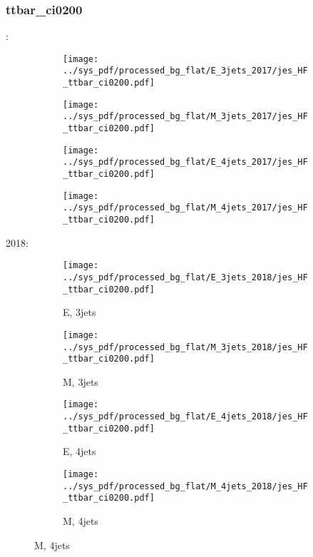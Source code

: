 \documentclass{beamer}
\begin{document}
\begin{frame}
\frametitle{ttbar_ci0200}
\fontsize{5}{1}:
\begin{figure}
\centering
\begin{subfigure}[b]{0.24\textwidth}
\texttt{[image: ../sys\_pdf/processed\_bg\_flat/E\_3jets\_2017/jes\_HF\_ttbar\_ci0200.pdf]}
\end{subfigure}
\begin{subfigure}[b]{0.24\textwidth}
\texttt{[image: ../sys\_pdf/processed\_bg\_flat/M\_3jets\_2017/jes\_HF\_ttbar\_ci0200.pdf]}
\end{subfigure}
\begin{subfigure}[b]{0.24\textwidth}
\texttt{[image: ../sys\_pdf/processed\_bg\_flat/E\_4jets\_2017/jes\_HF\_ttbar\_ci0200.pdf]}
\end{subfigure}
\begin{subfigure}[b]{0.24\textwidth}
\texttt{[image: ../sys\_pdf/processed\_bg\_flat/M\_4jets\_2017/jes\_HF\_ttbar\_ci0200.pdf]}
\end{subfigure}
\end{figure}
2018:
\begin{figure}
\centering
\begin{subfigure}[b]{0.24\textwidth}
\texttt{[image: ../sys\_pdf/processed\_bg\_flat/E\_3jets\_2018/jes\_HF\_ttbar\_ci0200.pdf]}
\captionsetup{font=tiny}
\caption{E, 3jets}
\end{subfigure}
\begin{subfigure}[b]{0.24\textwidth}
\texttt{[image: ../sys\_pdf/processed\_bg\_flat/M\_3jets\_2018/jes\_HF\_ttbar\_ci0200.pdf]}
\captionsetup{font=tiny}
\caption{M, 3jets}
\end{subfigure}
\begin{subfigure}[b]{0.24\textwidth}
\texttt{[image: ../sys\_pdf/processed\_bg\_flat/E\_4jets\_2018/jes\_HF\_ttbar\_ci0200.pdf]}
\captionsetup{font=tiny}
\caption{E, 4jets}
\end{subfigure}
\begin{subfigure}[b]{0.24\textwidth}
\texttt{[image: ../sys\_pdf/processed\_bg\_flat/M\_4jets\_2018/jes\_HF\_ttbar\_ci0200.pdf]}
\captionsetup{font=tiny}
\caption{M, 4jets}
\end{subfigure}
\end{figure}
\end{frame}
\end{document}
